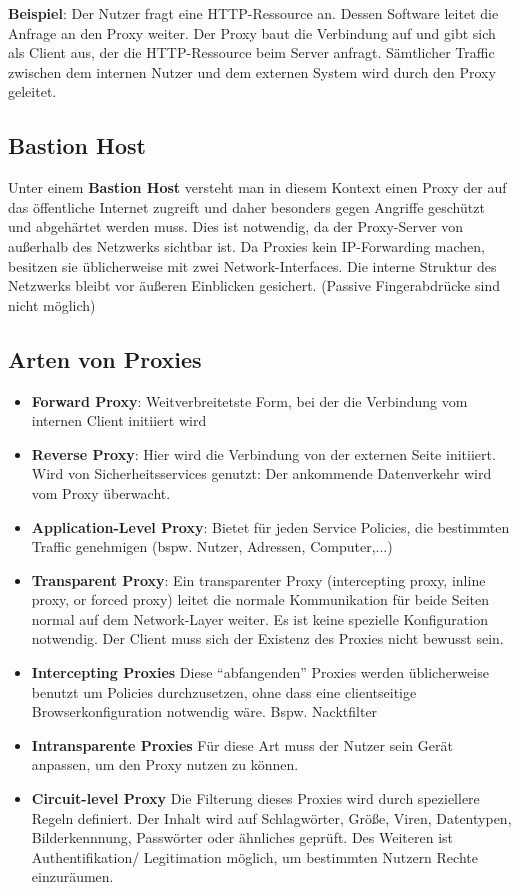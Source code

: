 \documentclass{article} %
\begin{document}
\textbf{Beispiel}: Der Nutzer fragt eine HTTP-Ressource an. Dessen Software leitet die Anfrage an den Proxy weiter. Der Proxy baut die Verbindung auf und gibt sich als Client aus, der die HTTP-Ressource beim Server anfragt. Sämtlicher Traffic zwischen dem internen Nutzer und dem externen System wird durch den Proxy geleitet.\\

\subsection{Bastion Host}
Unter einem \textbf{Bastion Host} versteht man in diesem Kontext einen Proxy der auf das öffentliche Internet zugreift und daher besonders gegen Angriffe geschützt und abgehärtet werden muss. Dies ist notwendig, da der Proxy-Server von außerhalb des Netzwerks sichtbar ist. Da Proxies kein IP-Forwarding machen, besitzen sie üblicherweise mit zwei Network-Interfaces. Die interne Struktur des Netzwerks bleibt vor äußeren Einblicken gesichert. (Passive Fingerabdrücke sind nicht möglich)\\

\subsection{Arten von Proxies}
	\begin{itemize}
	\item \textbf{Forward Proxy}: Weitverbreitetste Form, bei der die Verbindung vom internen Client initiiert wird
	\item \textbf{Reverse Proxy}: Hier wird die Verbindung von der externen Seite initiiert. Wird von Sicherheitsservices genutzt: Der ankommende Datenverkehr wird vom Proxy überwacht.
	\item \textbf{Application-Level Proxy}: Bietet für jeden Service Policies, die bestimmten Traffic genehmigen (bspw. Nutzer, Adressen, Computer,...)
	\item \textbf{Transparent Proxy}: Ein transparenter Proxy (intercepting proxy, inline proxy, or forced proxy) leitet die normale Kommunikation für beide Seiten normal auf dem Network-Layer weiter. Es ist keine spezielle Konfiguration notwendig. Der Client muss sich der Existenz des Proxies nicht bewusst sein.
	\item \textbf{Intercepting Proxies} Diese "`abfangenden"' Proxies werden üblicherweise benutzt um Policies durchzusetzen, ohne dass eine clientseitige Browserkonfiguration notwendig wäre. Bspw. Nacktfilter
	\item \textbf{Intransparente Proxies} Für diese Art muss der Nutzer sein Gerät anpassen, um den Proxy nutzen zu können.
	\item \textbf{Circuit-level Proxy} Die Filterung dieses Proxies wird durch speziellere Regeln definiert. Der Inhalt wird auf Schlagwörter, Größe, Viren, Datentypen, Bilderkennnung, Passwörter oder ähnliches geprüft. Des Weiteren ist Authentifikation/ Legitimation möglich, um bestimmten Nutzern Rechte einzuräumen.
	\end{itemize}
\end{document}
